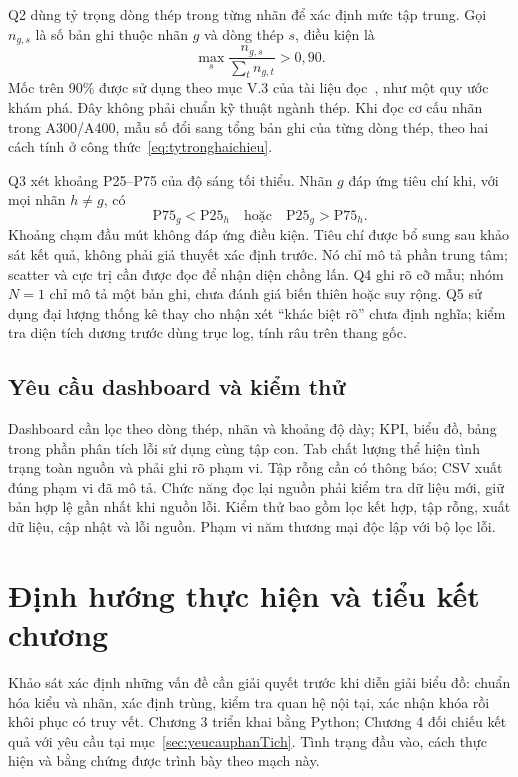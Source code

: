 Q2 dùng tỷ trọng dòng thép trong từng nhãn để xác định mức tập trung. Gọi $n_{g,s}$ là số bản ghi thuộc nhãn $g$ và dòng thép $s$, điều kiện là
\begin{equation}
  \max_s\frac{n_{g,s}}{\sum_t n_{g,t}}>0{,}90.
  \label{eq:tieuchiq2}
\end{equation}
Mốc trên 90\% được sử dụng theo mục V.3 của tài liệu đọc~\cite{reading}, như một quy ước khám phá. Đây không phải chuẩn kỹ thuật ngành thép. Khi đọc cơ cấu nhãn trong A300/A400, mẫu số đổi sang tổng bản ghi của từng dòng thép, theo hai cách tính ở công thức~\ref{eq:tytronghaichieu}.

Q3 xét khoảng P25--P75 của độ sáng tối thiểu. Nhãn $g$ đáp ứng tiêu chí khi, với mọi nhãn $h\ne g$, có
\begin{equation}
  \mathrm{P75}_g<\mathrm{P25}_h
  \quad\text{hoặc}\quad
  \mathrm{P25}_g>\mathrm{P75}_h.
  \label{eq:tieuchiq3}
\end{equation}
Khoảng chạm đầu mút không đáp ứng điều kiện. Tiêu chí được bổ sung sau khảo sát kết quả, không phải giả thuyết xác định trước. Nó chỉ mô tả phần trung tâm; scatter và cực trị cần được đọc để nhận diện chồng lấn. Q4 ghi rõ cỡ mẫu; nhóm $N=1$ chỉ mô tả một bản ghi, chưa đánh giá biến thiên hoặc suy rộng. Q5 sử dụng đại lượng thống kê thay cho nhận xét ``khác biệt rõ'' chưa định nghĩa; kiểm tra diện tích dương trước dùng trục log, tính râu trên thang gốc.

\subsection{Yêu cầu dashboard và kiểm thử}

Dashboard cần lọc theo dòng thép, nhãn và khoảng độ dày; KPI, biểu đồ, bảng trong phần phân tích lỗi sử dụng cùng tập con. Tab chất lượng thể hiện tình trạng toàn nguồn và phải ghi rõ phạm vi. Tập rỗng cần có thông báo; CSV xuất đúng phạm vi đã mô tả. Chức năng đọc lại nguồn phải kiểm tra dữ liệu mới, giữ bản hợp lệ gần nhất khi nguồn lỗi. Kiểm thử bao gồm lọc kết hợp, tập rỗng, xuất dữ liệu, cập nhật và lỗi nguồn. Phạm vi năm thương mại độc lập với bộ lọc lỗi.

\section{Định hướng thực hiện và tiểu kết chương}

Khảo sát xác định những vấn đề cần giải quyết trước khi diễn giải biểu đồ: chuẩn hóa kiểu và nhãn, xác định trùng, kiểm tra quan hệ nội tại, xác nhận khóa rồi khôi phục có truy vết. Chương 3 triển khai bằng Python; Chương 4 đối chiếu kết quả với yêu cầu tại mục~\ref{sec:yeucauphanTich}. Tình trạng đầu vào, cách thực hiện và bằng chứng được trình bày theo mạch này.
